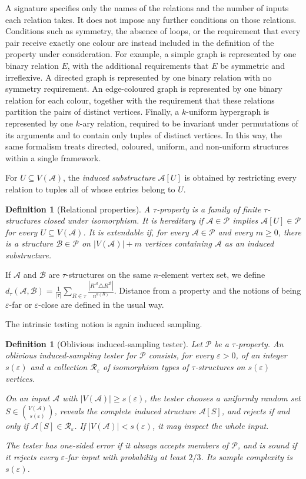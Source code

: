 \documentclass[11pt,reqno,letterpaper]{amsart}
\newcommand{\cA}{{\mathcal A}}
\newcommand{\cB}{{\mathcal B}}
\newcommand{\cP}{{\mathcal P}}
\newcommand{\cR}{{\mathcal R}}
\theoremstyle{plain}
\newtheorem{defn}[thm]{Definition}
\theoremstyle{remark}
\begin{document}
A signature specifies only the names of the relations and the number of inputs each relation takes. It does not impose any further conditions on those relations. Conditions such as symmetry, the absence of loops, or the requirement that every pair receive exactly one colour are instead included in the definition of the property under consideration.
For example, a simple graph is represented by one binary relation $E$, with the additional requirements that $E$ be symmetric and irreflexive. A directed graph is represented by one binary relation with no symmetry requirement. An edge-coloured graph is represented by one binary relation for each colour, together with the requirement that these relations partition the pairs of distinct vertices. Finally, a $k$-uniform hypergraph is represented by one $k$-ary relation, required to be invariant under permutations of its arguments and to contain only tuples of distinct vertices.
In this way, the same formalism treats directed, coloured, uniform, and non-uniform structures within a single framework.

For $U\subseteq V(\cA)$, the \textit{induced substructure} $\cA[U]$ is obtained
by restricting every relation to tuples all of whose entries belong to $U$.

\begin{defn}[Relational properties]
A $\tau$-property is a family of finite $\tau$-structures closed under isomorphism. It is \textit{hereditary} if $\cA\in\cP$ implies $\cA[U]\in\cP$ for every $U\subseteq V(\cA)$. It is \textit{extendable} if, for every $\cA\in\cP$ and every $m\geq0$, there is a structure $\cB\in\cP$ on $|V(\cA)|+m$ vertices containing $\cA$ as an induced substructure.
\end{defn}

If $\cA$ and $\cB$ are $\tau$-structures on the same $n$-element vertex set, we define
\(d_\tau(\cA,\cB) = \frac{1}{|\tau|} \sum_{R\in\tau} \frac{|R^{\cA}\triangle R^{\cB}|}{n^{a(R)}}.\)
Distance from a property and the notions of being $\varepsilon$-far or $\varepsilon$-close are defined in the usual way.

The intrinsic testing notion is again induced sampling.

\begin{defn}[Oblivious induced-sampling tester]
Let $\cP$ be a $\tau$-property. An \textit{oblivious induced-sampling tester} for $\cP$ consists, for every $\varepsilon>0$, of an integer $s(\varepsilon)$ and a collection $\cR_\varepsilon$ of isomorphism types of $\tau$-structures on $s(\varepsilon)$ vertices.

On an input $\cA$ with $|V(\cA)|\geq s(\varepsilon)$, the tester chooses a uniformly random set $S\in\binom{V(\cA)}{s(\varepsilon)}$, reveals the complete induced structure $\cA[S]$, and rejects if and only if $\cA[S]\in\cR_\varepsilon$. If $|V(\cA)|<s(\varepsilon)$, it may inspect the whole input.

The tester has one-sided error if it always accepts members of $\cP$, and is sound if it rejects every $\varepsilon$-far input with probability at least $2/3$. Its sample complexity is $s(\varepsilon)$.
\end{defn}
\end{document}

